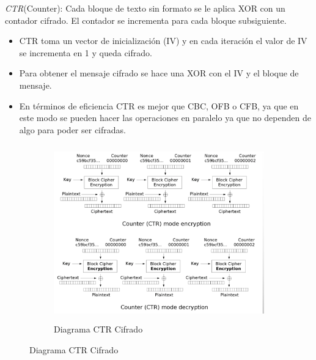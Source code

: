 \textit{CTR}(Counter): Cada bloque de texto sin formato se le aplica XOR con un contador cifrado. El contador se incrementa para cada bloque subsiguiente.\\
\begin{itemize}
	\item CTR toma un vector de inicialización (IV) y en cada iteración el valor de IV se incrementa en 1 y queda cifrado.
	\item Para obtener el mensaje cifrado se hace una XOR con el IV y el bloque de mensaje.
	\item En términos de eficiencia CTR es mejor que CBC, OFB o CFB, ya que en este modo se pueden hacer las operaciones en paralelo ya que no dependen de algo para poder ser cifradas.
\end{itemize}

\begin{figure}[h]
    \centering
    \begin{subfigure}[t]{0.5\textwidth}
        \centering
        \includegraphics[height=3in]{./images/CTR.png}
        \caption{Diagrama CTR Cifrado}
        \label{fig:1-3-1}
    \end{subfigure}
\end{figure}


\pagebreak
